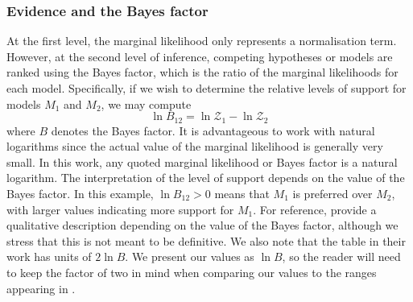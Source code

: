 \documentclass[fleqn,usenatbib]{mnras}
\begin{document}
        \subsubsection{Evidence and the Bayes factor}
        \label{subs:evidence}
            At the first level, the marginal likelihood only represents a normalisation term.
            However, at the second level of inference, competing hypotheses or models are ranked using the Bayes factor, which is the ratio of the marginal likelihoods for each model.
            Specifically, if we wish to determine the relative levels of support for models $M_1$ and $M_2$, we may compute
            \begin{equation}
                \ln B_{12} = \ln \mathcal{Z}_1 - \ln \mathcal{Z}_2
            \end{equation}    
            where $B$ denotes the Bayes factor.
            It is advantageous to work with natural logarithms since the actual value of the marginal likelihood is generally very small.
            In this work, any quoted marginal likelihood or Bayes factor is a natural logarithm.
            The interpretation of the level of support depends on the value of the Bayes factor.
            In this example, $\ln B_{12} > 0$ means that $M_1$ is preferred over $M_2$, with larger values indicating more support for $M_1$.
            For reference, \citet{kass1995} provide a qualitative description depending on the value of the Bayes factor, although we stress that this is not meant to be definitive.
            We also note that the table in their work has units of $2 \ln B$.
            We present our values as $\ln B$, so the reader will need to keep the factor of two in mind when comparing our values to the ranges appearing in \citet{kass1995}.
\end{document}
